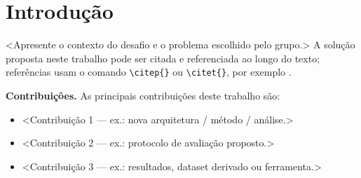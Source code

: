\section{Introdu\c{c}\~ao}
\label{sec:introducao}


<Apresente o contexto do desafio e o problema escolhido pelo grupo.>
A solu\c{c}\~ao proposta neste trabalho pode ser citada e referenciada ao longo
do texto; refer\^encias usam o comando \verb|\citep{}| ou \verb|\citet{}|, por
exemplo \citep{lewis2020rag}.

\medskip\noindent\textbf{Contribui\c{c}\~oes.} As principais contribui\c{c}\~oes deste trabalho s\~ao:
\begin{itemize}
  \itemsep2pt
  \item <Contribui\c{c}\~ao 1 --- ex.: nova arquitetura / m\'etodo / an\'alise.>
  \item <Contribui\c{c}\~ao 2 --- ex.: protocolo de avalia\c{c}\~ao proposto.>
  \item <Contribui\c{c}\~ao 3 --- ex.: resultados, dataset derivado ou ferramenta.>
\end{itemize}
